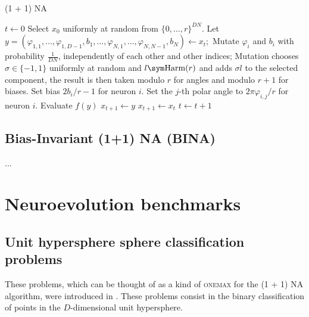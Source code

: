 \begin{algorithm}
\caption{(1 + 1) NA}
\label{alg:na}
\begin{algorithmic}
    \State $t \gets 0$
    \State Select $x_0$ uniformly at random from $\{0, \ldots, r\}^{DN}$.
        \State Let $y = (\varphi_{1,1}, \ldots, \varphi_{1,D-1}, b_1, \ldots, \varphi_{N,1}, \ldots, \varphi_{N,N-1}, b_N) \gets x_t;$
            \State Mutate $\varphi_i$ and $b_i$ with probability $\frac{1}{DN}$, independently of each other and other indices;
            \State Mutation chooses $\sigma \in \{-1, 1\}$ uniformly at random and $l \sym \text{Harm}(r)$ and adds $\sigma l$ to the selected component, the
            result is then taken modulo $r$ for angles and modulo $r + 1$ for biases.
                \State Set bias $2b_i / r - 1$ for neuron $i$.
                    \State Set the $j$-th polar angle to $2\pi \varphi_{i,j} / r$ for neuron $i$.
                \EndFor
            \EndFor
            \State Evaluate $f(y)$
                \State $x_{t+1} \gets y$
            \Else
                \State $x_{t+1} \gets x_t$
            \EndIf
        \EndFor
        \State $t \gets t + 1$
    \EndWhile
\end{algorithmic}
\end{algorithm}

\subsection{Bias-Invariant (1+1) NA (BINA)}

...

\section{Neuroevolution benchmarks}

\subsection{Unit hypersphere sphere classification problems}


These problems, which can be thought of as a kind of \textsc{onemax} for the (1 + 1) NA algorithm, were introduced in \cite{na}.
These problems consist in the binary classification of points in the $D$-dimensional unit hypersphere.

